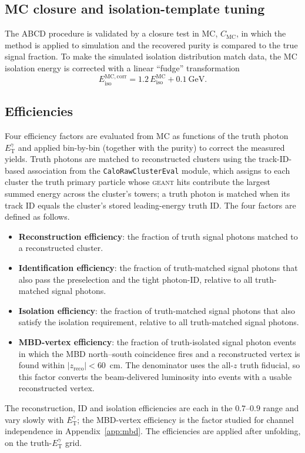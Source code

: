 \documentclass[11pt]{article}
\newcommand{\ETg}{E_{\mathrm{T}}^{\gamma}}
\newcommand{\Eiso}{E_{\mathrm{iso}}}
\begin{document}
\subsection{MC closure and isolation-template tuning}

The ABCD procedure is validated by a closure test in MC, $C_{\mathrm{MC}}$, in
which the method is applied to simulation and the recovered purity is compared to
the true signal fraction. To make the simulated isolation distribution match
data, the MC isolation energy is corrected with a linear ``fudge'' transformation
\begin{equation}
  \Eiso^{\mathrm{MC,corr}} = 1.2\,\Eiso^{\mathrm{MC}} + 0.1~\mathrm{GeV}.
\end{equation}

\subsection{Efficiencies}

Four efficiency factors are evaluated from MC as functions of the truth photon
$\ETg$ and applied bin-by-bin (together with the purity) to correct the measured
yields. Truth photons are matched to reconstructed clusters using the
track-ID-based association from the \texttt{CaloRawClusterEval} module, which
assigns to each cluster the truth primary particle whose \textsc{geant} hits
contribute the largest summed energy across the cluster's towers; a truth photon
is matched when its track ID equals the cluster's stored leading-energy truth ID.
The four factors are defined as follows.
\begin{itemize}[noitemsep]
  \item \textbf{Reconstruction efficiency}: the fraction of truth signal photons
        matched to a reconstructed cluster.
  \item \textbf{Identification efficiency}: the fraction of truth-matched signal
        photons that also pass the preselection and the tight photon-ID, relative
        to all truth-matched signal photons.
  \item \textbf{Isolation efficiency}: the fraction of truth-matched signal
        photons that also satisfy the isolation requirement, relative to all
        truth-matched signal photons.
  \item \textbf{MBD-vertex efficiency}: the fraction of truth-isolated signal
        photon events in which the MBD north--south coincidence fires and a
        reconstructed vertex is found within $|z_{\mathrm{reco}}|<60$~cm. The
        denominator uses the all-$z$ truth fiducial, so this factor converts the
        beam-delivered luminosity into events with a usable reconstructed vertex.
\end{itemize}
The reconstruction, ID and isolation efficiencies are each in the $0.7$--$0.9$
range and vary slowly with $\ETg$; the MBD-vertex efficiency is the factor
studied for channel independence in Appendix~\ref{app:mbd}. The efficiencies are
applied after unfolding, on the truth-$\ETg$ grid.
\end{document}

